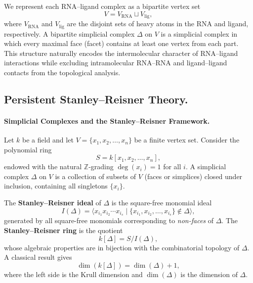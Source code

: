 \documentclass[10pt,twocolumn]{article}
\begin{document}
We represent each RNA--ligand complex as a bipartite vertex set
\begin{equation}
V = V_{\mathrm{RNA}} \sqcup V_{\mathrm{lig}},
\label{eq:bipartite}
\end{equation}
where $V_{\mathrm{RNA}}$ and $V_{\mathrm{lig}}$ are the disjoint sets of
heavy atoms in the RNA and ligand, respectively.
A bipartite simplicial complex $\Delta$ on $V$ is a simplicial complex in which
every maximal face (facet) contains at least one vertex from each part.
This structure naturally encodes the intermolecular character of RNA--ligand
interactions while excluding intramolecular RNA--RNA and ligand--ligand contacts
from the topological analysis.


\subsection{Persistent Stanley--Reisner Theory.}

\paragraph{Simplicial Complexes and the Stanley--Reisner Framework.}
Let $k$ be a field and let $V = \{x_1, x_2, \ldots, x_n\}$ be a finite vertex set.
Consider the polynomial ring
\begin{equation}
S = k[x_1, x_2, \ldots, x_n],
\label{eq:polyring}
\end{equation}
endowed with the natural $\mathbb{Z}$-grading $\deg(x_i) = 1$ for all $i$.
A simplicial complex $\Delta$ on $V$ is a collection of subsets of $V$
(faces or simplices) closed under inclusion, containing all singletons $\{x_i\}$.

The \textbf{Stanley--Reisner ideal} of $\Delta$ is the square-free monomial ideal
\begin{equation}
I(\Delta) = \langle x_{i_1} x_{i_2} \cdots x_{i_s} \mid
             \{x_{i_1}, x_{i_2}, \ldots, x_{i_s}\} \notin \Delta \rangle,
\label{eq:sr_ideal}
\end{equation}
generated by all square-free monomials corresponding to \emph{non-faces} of $\Delta$.
The \textbf{Stanley--Reisner ring} is the quotient
\begin{equation}
k[\Delta] = S / I(\Delta),
\label{eq:sr_ring}
\end{equation}
whose algebraic properties are in bijection with the combinatorial topology of $\Delta$.
A classical result gives
\begin{equation}
\dim(k[\Delta]) = \dim(\Delta) + 1,
\label{eq:krull}
\end{equation}
where the left side is the Krull dimension and $\dim(\Delta)$ is the dimension of $\Delta$.
\end{document}
